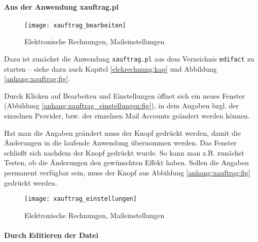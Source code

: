 \paragraph{Aus der Anwendung xauftrag.pl}

\begin{figure}[ht]
\centering
\texttt{[image: xauftrag\_bearbeiten]}
\caption{Elektronische Rechnungen, Maileinstellungen \label{anhang:xauftrag:fig}}
\end{figure}

Dazu ist zunächst die Anwendung \verb|xauftrag.pl| aus dem Verzeichnis
\verb|edifact| zu starten -- siehe dazu auch Kapitel \vref{elekrechnung:kap} 
und Abbildung \vref{anhang:xauftrag:fig}.


Durch Klicken auf Bearbeiten und Einstellungen öffnet sich ein neues 
Fenster (Abbildung \vref{anhang:xauftrag_einstellungen:fig}), 
in dem  Angaben bzgl. der 
einzelnen Provider, bzw. der einzelnen Mail Accounts geändert werden können.

Hat man die Angaben geändert muss der Knopf 
 gedrückt werden, damit die
Änderungen in die laufende Anwendung übernommen werden. Das Fenster schließt
sich nachdem der Knopf gedrückt wurde.
So kann man z.B. zunächst Testen, ob die Änderungen den gewünschten Effekt 
haben. Sollen die Angaben permanent verfügbar sein, muss der Knopf
 aus Abbildung \vref {anhang:xauftrag:fig}
gedrückt werden.

\begin{figure}[ht]
\centering
\texttt{[image: xauftrag\_einstellungen]}
\caption{Elektronische Rechnungen, Maileinstellungen \label{anhang:xauftrag_einstellungen:fig}}
\end{figure}


\paragraph{Durch Editieren der Datei}

